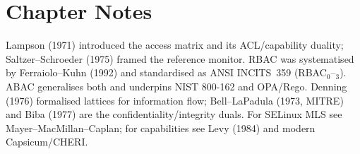 \section*{Chapter Notes}
Lampson (1971) introduced the access matrix and its ACL/capability duality; Saltzer--Schroeder (1975) framed the reference monitor. RBAC was systematised by Ferraiolo--Kuhn (1992) and standardised as ANSI INCITS~359 (RBAC$_{0}$--$_{3}$). ABAC generalises both and underpins NIST 800-162 and OPA/Rego. Denning (1976) formalised lattices for information flow; Bell--LaPadula (1973, MITRE) and Biba (1977) are the confidentiality/integrity duals. For SELinux MLS see Mayer--MacMillan--Caplan; for capabilities see Levy (1984) and modern Capsicum/CHERI.
